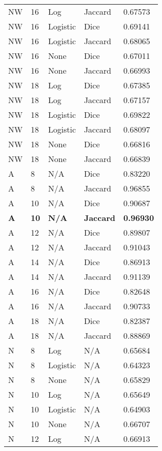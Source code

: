 \documentclass{article}
\begin{document}
\begin{center}
\begin{supertabular}{| l | l | l | l | l |}
            NW & 16 & Log & Jaccard & 0.67573 \\
            NW & 16 & Logistic & Dice & 0.69141 \\
            NW & 16 & Logistic & Jaccard & 0.68065 \\
            NW & 16 & None & Dice & 0.67011 \\
            NW & 16 & None & Jaccard & 0.66993 \\
            NW & 18 & Log & Dice & 0.67385 \\
            NW & 18 & Log & Jaccard & 0.67157 \\
            NW & 18 & Logistic & Dice & 0.69822 \\
            NW & 18 & Logistic & Jaccard & 0.68097 \\
            NW & 18 & None & Dice & 0.66816 \\
            NW & 18 & None & Jaccard & 0.66839 \\
            A & 8 & N/A & Dice & 0.83220 \\
            A & 8 & N/A & Jaccard & 0.96855 \\
            A & 10 & N/A & Dice & 0.90687 \\
            \textbf{A} & \textbf{10} & \textbf{N/A} & \textbf{Jaccard} & \textbf{0.96930} \\
            A & 12 & N/A & Dice & 0.89807 \\
            A & 12 & N/A & Jaccard & 0.91043 \\
            A & 14 & N/A & Dice & 0.86913 \\
            A & 14 & N/A & Jaccard & 0.91139 \\
            A & 16 & N/A & Dice & 0.82648 \\
            A & 16 & N/A & Jaccard & 0.90733 \\
            A & 18 & N/A & Dice & 0.82387 \\
            A & 18 & N/A & Jaccard & 0.88869 \\
            N & 8 & Log & N/A & 0.65684 \\
            N & 8 & Logistic & N/A & 0.64323 \\
            N & 8 & None & N/A & 0.65829 \\
            N & 10 & Log & N/A & 0.65649 \\
            N & 10 & Logistic & N/A & 0.64903 \\
            N & 10 & None & N/A & 0.66707 \\
            N & 12 & Log & N/A & 0.66913 \\

\end{supertabular}
\end{center}
\end{document}
